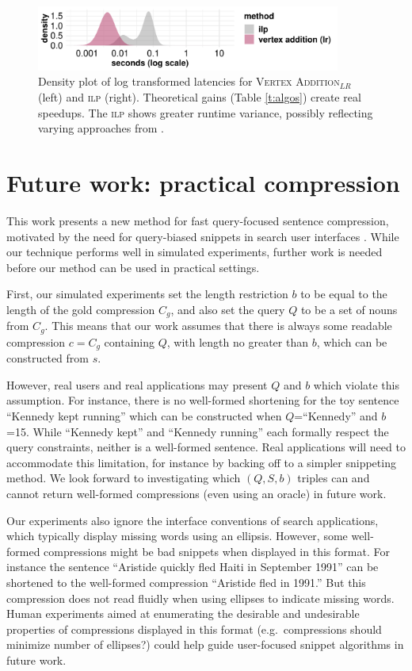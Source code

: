 \documentclass[11pt,a4paper]{article}
\begin{document}
{\begin{figure}[htb!]
\centering
\includegraphics[width=10cm]{times.pdf}
\caption{Density plot of log transformed latencies for \textsc{Vertex Addition}$_{LR}$ (left) and \textsc{ilp} (right). Theoretical gains (Table \ref{t:algos}) create real speedups. The \textsc{ilp} shows greater runtime variance, possibly reflecting varying approaches from \citet{gurobi}.}
\label{t:times}
\end{figure}

\section{Future work: practical compression}

This work presents a new method for fast query-focused sentence compression, motivated by the need for query-biased snippets in search user interfaces \cite{tombros1998advantages,marchionini2006exploratory}. While our technique performs well in simulated experiments, further work is needed before our method can be used in practical settings.

First, our simulated experiments set the length restriction $b$ to be equal to the length of the gold compression $C_g$, and also set the query $Q$ to be a set of nouns from $C_g$. This means that our work assumes that there is always some readable compression $c=C_g$ containing $Q$, with length no greater than $b$, which can be constructed from $s$. 

However, real users and real applications may present $Q$ and $b$ which violate this assumption. For instance, there is no well-formed shortening for the toy sentence ``Kennedy kept running'' which can be constructed when $Q$=``Kennedy'' and $b$=15. While ``Kennedy kept'' and ``Kennedy running'' each formally respect the query constraints, neither is a well-formed sentence. Real applications will need to accommodate this limitation, for instance by backing off to a simpler snippeting method. We look forward to investigating which $(Q,S,b)$ triples can and cannot return well-formed compressions (even using an oracle) in future work.

Our experiments also ignore the interface conventions of search applications, which typically display missing words using an ellipsis. However, some well-formed compressions might be bad snippets when displayed in this format. For instance the sentence ``Aristide quickly fled Haiti in September 1991'' can be shortened to the well-formed compression ``Aristide fled in 1991.'' But this compression does not read fluidly when using ellipses to indicate missing words. Human experiments aimed at enumerating the desirable and undesirable properties of compressions displayed in this format (e.g.\ compressions should minimize number of ellipses?) could help guide user-focused snippet algorithms in future work. 

}
\end{document}
